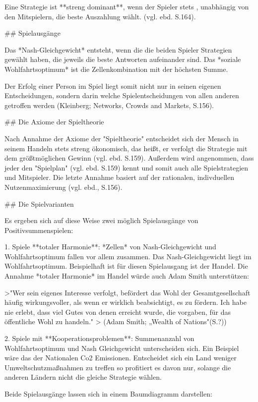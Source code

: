 Eine Strategie ist **streng dominant**, wenn der Spieler  stets , unabhängig von den Mitspielern, die beste Auszahlung  wählt. (vgl. ebd. S.164).

## Spielausgänge

Das *Nash-Gleichgewicht* entsteht, wenn die die beiden Spieler Strategien gewählt haben, die jeweils die beste Antworten aufeinander sind.
Das *soziale Wohlfahrtsoptimum* ist die Zellenkombination mit der höchsten Summe.

Der Erfolg einer Person im Spiel liegt somit nicht nur in seinen eigenen Entscheidungen, sondern darin welche Spielentscheidungen von allen anderen getroffen werden (Kleinberg; Networks, Crowds and Markets, S.156).

## Die Axiome der Spieltheorie

Nach Annahme der Axiome der "Spieltheorie" entscheidet sich der Mensch in seinem Handeln stets streng ökonomisch, das heißt, er verfolgt die Strategie mit dem größtmöglichen Gewinn (vgl. ebd. S.159).
Außerdem wird angenommen, dass jeder den "Spielplan" (vgl. ebd. S.159) kennt und somit auch alle Spielstrategien und Mitspieler.
Die letzte Annahme basiert auf der rationalen, indivduellen Nutzenmaximierung (vgl. ebd., S.156).

## Die Spielvarianten

Es ergeben sich auf diese Weise zwei möglich Spielausgänge von Positivsummenspielen:

1. Spiele **totaler Harmonie**: *Zellen*  von Nash-Gleichgewicht und Wohlfahrtsoptimum fallen vor allem zusammen. Das Nash-Gleichgewicht liegt im Wohlfahrtsoptimum.
Beispielhaft ist für diesen Spielausgang ist der Handel.
Die Annahme *totaler Harmonie* im Handel würde auch Adam Smith unterstützen:

>"Wer sein eigenes Interesse verfolgt, befördert das Wohl der Gesamtgesellschaft häufig wirkungsvoller, als wenn er wirklich beabsichtigt, es zu fördern. Ich habe nie erlebt, dass viel Gutes von denen erreicht wurde, die vorgaben, für das öffentliche Wohl zu handeln."
> (Adam Smith; „Wealth of Nations"(S.?))

2. Spiele mit **Kooperationsproblemen**: Summenanzahl von Wohlfahrtsoptimum und Nash Gleichgewicht unterscheiden sich.
Ein Beispiel wäre das der Nationalen Co2 Emissionen. Entscheidet sich ein Land weniger Umweltschutzmaßnahmen zu treffen so profitiert es davon nur, solange die anderen Ländern nicht die gleiche Strategie wählen.

Beide Spielausgänge lassen sich in einem Baumdiagramm darstellen:

